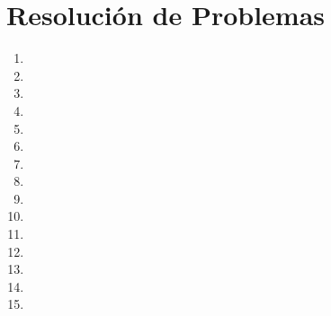 \section{Resolución de Problemas}
\begin{enumerate}
    \item
    

    \item 
    

    \item 
    

    \item
    

    \item 
    

    \item 
    

    \item
    

    \item
    

    \item
    

    \item
    

    \item
    

    \item
    

    \item
    
    
    \item 
    

    \item
    
\end{enumerate}

\newpage
